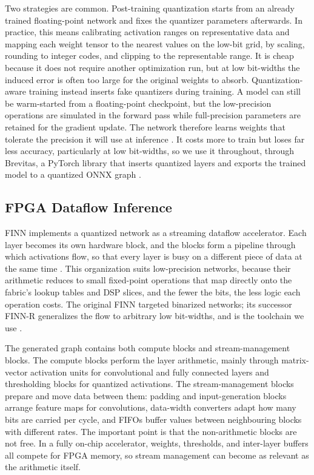 Two strategies are common. Post-training quantization starts from an already
trained floating-point network and fixes the quantizer parameters afterwards. In
practice, this means calibrating activation ranges on representative data and
mapping each weight tensor to the nearest values on the low-bit grid, by scaling,
rounding to integer codes, and clipping to the representable range. It is cheap
because it does not require another optimization run, but at low bit-widths the
induced error is often too large for the original weights to absorb.
Quantization-aware training instead inserts fake quantizers during training. A
model can still be warm-started from a floating-point checkpoint, but the
low-precision operations are simulated in the forward pass while full-precision
parameters are retained for the gradient update. The network therefore learns
weights that tolerate the precision it will use at inference
\cite{jacob2018quantization}. It costs more to train but loses far less accuracy,
particularly at low bit-widths, so we use it throughout, through Brevitas, a
PyTorch library that inserts quantized layers and exports the trained model to a
quantized ONNX graph \cite{pappalardo2023brevitas}.

\subsection{FPGA Dataflow Inference}
\label{sec:bg-fpga}

FINN implements a quantized network as a streaming dataflow accelerator. Each
layer becomes its own hardware block, and the blocks form a pipeline through which
activations flow, so that every layer is busy on a different piece of data at the
same time \cite{umuroglu2017finn}. This organization suits low-precision networks,
because their arithmetic reduces to small fixed-point operations that map directly
onto the fabric's lookup tables and DSP slices, and the fewer the bits, the less
logic each operation costs. The original FINN targeted binarized networks; its
successor FINN-R generalizes the flow to arbitrary low bit-widths, and is the
toolchain we use \cite{blott2018finnr}.

The generated graph contains both compute blocks and stream-management blocks.
The compute blocks perform the layer arithmetic, mainly through matrix-vector
activation units for convolutional and fully connected layers and thresholding
blocks for quantized activations. The stream-management blocks prepare and move
data between them: padding and input-generation blocks arrange feature maps for
convolutions, data-width converters adapt how many bits are carried per cycle,
and FIFOs buffer values between neighbouring blocks with different rates. The
important point is that the non-arithmetic blocks are not free. In a fully
on-chip accelerator, weights, thresholds, and inter-layer buffers all compete for
FPGA memory, so stream management can become as relevant as the arithmetic itself.

